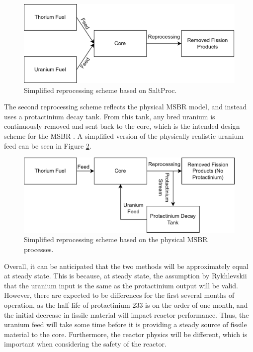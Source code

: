 \begin{figure}[H]
  \centering
  \includegraphics[scale=0.15]{images/sp-match-repr-scheme.png}
  \caption{Simplified reprocessing scheme based on SaltProc.}
   \label{fig:spmatchrepr}
\end{figure}

The second reprocessing scheme reflects the physical MSBR model, and instead uses a protactinium decay tank. From this tank, any bred uranium is continuously removed and sent back to the core, which is the intended design scheme for the MSBR \cite{robertson_conceptual_1971}. A simplified version of the physically realistic uranium feed can be seen in Figure \ref{fig:nonspmatchrepr}.

\begin{figure}[H]
  \centering
  \includegraphics[scale=0.15]{images/phys-repr-scheme.png}
  \caption{Simplified reprocessing scheme based on the physical MSBR processes.}
   \label{fig:nonspmatchrepr}
\end{figure}

Overall, it can be anticipated that the two methods will be approximately equal at steady state. This is because, at steady state, the assumption by Rykhlevskii that the uranium input is the same as the protactinium output will be valid. However, there are expected to be differences for the first several months of operation, as the half-life of protactinium-233 is on the order of one month, and the initial decrease in fissile material will impact reactor performance. Thus, the uranium feed will take some time before it is providing a steady source of fissile material to the core. Furthermore, the reactor physics will be different, which is important when considering the safety of the reactor.







